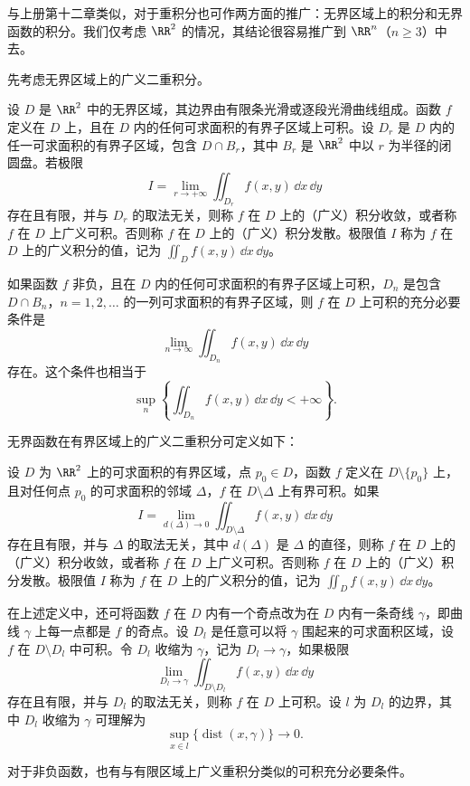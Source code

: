 与上册第十二章类似，对于重积分也可作两方面的推广：无界区域上的积分和无界函数的积分。我们仅考虑 $\RR^2$ 的情况，其结论很容易推广到 $\RR^n$（$n\ge3$）中去。

先考虑无界区域上的广义二重积分。

设 $D$ 是 $\RR^2$ 中的无界区域，其边界由有限条光滑或逐段光滑曲线组成。函数 $f$ 定义在 $D$ 上，且在 $D$ 内的任何可求面积的有界子区域上可积。设 $D_r$ 是 $D$ 内的任一可求面积的有界子区域，包含 $D\cap B_r$，其中 $B_r$ 是 $\RR^2$ 中以 $r$ 为半径的闭圆盘。若极限
\[
  I=\lim_{r\to+\infty}\iint_{D_r}f(x,y)\,\dd x\,\dd y
\]
存在且有限，并与 $D_r$ 的取法无关，则称 $f$ 在 $D$ 上的（广义）积分收敛，或者称 $f$ 在 $D$ 上广义可积。否则称 $f$ 在 $D$ 上的（广义）积分发散。极限值 $I$ 称为 $f$ 在 $D$ 上的广义积分的值，记为 $\iint_Df(x,y)\,\dd x\,\dd y$。

如果函数 $f$ 非负，且在 $D$ 内的任何可求面积的有界子区域上可积，$D_n$ 是包含 $D\cap B_n$，$n=1,2,\ldots$ 的一列可求面积的有界子区域，则 $f$ 在 $D$ 上可积的充分必要条件是
\[
  \lim_{n\to\infty}\iint_{D_n}f(x,y)\,\dd x\,\dd y
\]
存在。这个条件也相当于
\[
  \sup_n\left\{\iint_{D_n}f(x,y)\,\dd x\,\dd y<+\infty\right\}.
\]

无界函数在有界区域上的广义二重积分可定义如下：

设 $D$ 为 $\RR^2$ 上的可求面积的有界区域，点 $p_0\in D$，函数 $f$ 定义在 $D\setminus\{p_0\}$ 上，且对任何点 $p_0$ 的可求面积的邻域 $\Delta$，$f$ 在 $D\setminus\Delta$ 上有界可积。如果
\[
  I=\lim_{d(\Delta)\to0}\iint_{D\setminus\Delta}f(x,y)\,\dd x\,\dd y
\]
存在且有限，并与 $\Delta$ 的取法无关，其中 $d(\Delta)$ 是 $\Delta$ 的直径，则称 $f$ 在 $D$ 上的（广义）积分收敛，或者称 $f$ 在 $D$ 上广义可积。否则称 $f$ 在 $D$ 上的（广义）积分发散。极限值 $I$ 称为 $f$ 在 $D$ 上的广义积分的值，记为 $\iint_Df(x,y)\,\dd x\,\dd y$。

\begin{xremark}
在上述定义中，还可将函数 $f$ 在 $D$ 内有一个奇点改为在 $D$ 内有一条奇线 $\gamma$，即曲线 $\gamma$ 上每一点都是 $f$ 的奇点。设 $D_l$ 是任意可以将 $\gamma$ 围起来的可求面积区域，设 $f$ 在 $D\setminus D_l$ 中可积。令 $D_l$ 收缩为 $\gamma$，记为 $D_l\to\gamma$，如果极限
\[
  \lim_{D_l\to\gamma}\iint_{D\setminus D_l}f(x,y)\,\dd x\,\dd y
\]
存在且有限，并与 $D_l$ 的取法无关，则称 $f$ 在 $D$ 上可积。设 $l$ 为 $D_l$ 的边界，其中 $D_l$ 收缩为 $\gamma$ 可理解为
\[
  \sup_{x\in l}\{\operatorname{dist}(x,\gamma)\}\to0.
\]
\end{xremark}

对于非负函数，也有与有限区域上广义重积分类似的可积充分必要条件。

